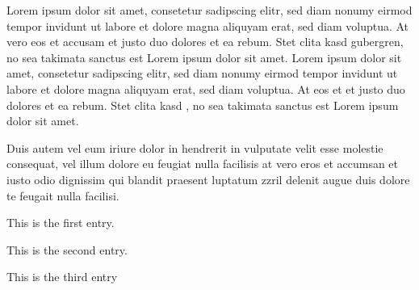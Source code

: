 



\EOAtoc



Lorem ipsum dolor sit amet, consetetur sadipscing
elitr, sed diam nonumy eirmod tempor invidunt ut
labore et dolore magna aliquyam erat, sed diam
voluptua.  At vero eos et accusam
et justo duo dolores et ea rebum.
 Stet clita kasd
gubergren, no sea takimata sanctus est Lorem ipsum
dolor sit amet.  Lorem ipsum dolor
sit amet, consetetur sadipscing elitr,
 sed diam nonumy eirmod
tempor invidunt ut labore et dolore magna aliquyam
erat, sed diam voluptua.  At
 eos et  et justo duo
dolores et ea rebum. Stet  clita kasd
, no sea takimata sanctus est
Lorem ipsum dolor sit amet.



Duis autem vel eum iriure dolor in hendrerit in
vulputate velit esse molestie consequat, vel illum
dolore eu feugiat nulla facilisis at vero eros et
accumsan et iusto odio dignissim qui blandit
praesent luptatum zzril delenit augue duis dolore
te feugait nulla facilisi.

\begin{EOAlist}
	\item This is the first entry.
	\item This is the second entry.
	\item This is the third entry
\end{EOAlist}

